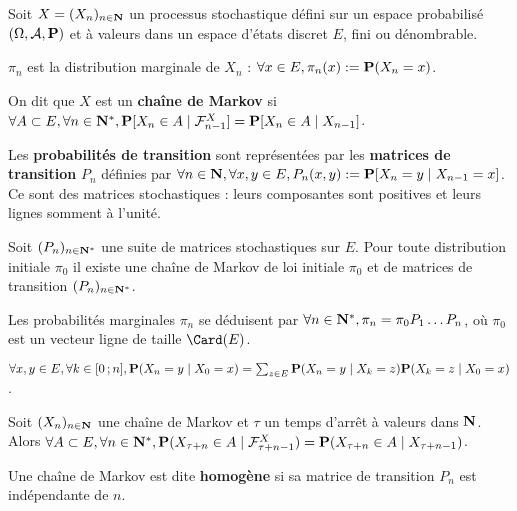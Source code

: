 Soit $X = (X_n)_{n \in \mathbf{N}}$ un processus stochastique défini sur un espace probabilisé $(\Omega,\mathcal{A},\mathbf{P})$ et à valeurs dans un espace d'états discret $E$, fini ou dénombrable.

\begin{note}
	$\pi_n$ est la distribution marginale de $X_n$ : $\forall x \in E, \pi_n(x) := \mathbf{P}(X_n = x)$.
\end{note}

\begin{defn}
	On dit que $X$ est un \textbf{chaîne de Markov} si $\forall A \subset E, \forall n \in \mathbf{N}^*, \mathbf{P}[X_n \in A \mid \mathcal{F}_{n - 1}^X] = \mathbf{P}[X_n \in A \mid X_{n - 1}]$.
\end{defn}

Les \textbf{probabilités de transition} sont représentées par les \textbf{matrices de transition} $P_n$ définies par $\forall n \in \mathbf{N}, \forall x,y \in E, P_n(x,y) := \mathbf{P} [X_n = y \mid X_{n - 1} = x]$.
Ce sont des matrices stochastiques : leurs composantes sont positives et leurs lignes somment à l'unité.

\begin{pop}
	Soit $(P_n)_{n \in \mathbf{N}^*}$ une suite de matrices stochastiques sur $E$.
	Pour toute distribution initiale $\pi_0$ il existe une chaîne de Markov de loi initiale $\pi_0$ et de matrices de transition $(P_n)_{n \in \mathbf{N}^*}$.
\end{pop}

Les probabilités marginales $\pi_n$ se déduisent par $\forall n \in \mathbf{N}^*, \pi_n = \pi_0 P_1 \ldots P_n$, où $\pi_0$ est un vecteur ligne de taille $\Card(E)$.

\begin{pop}
	$\forall x,y \in E, \forall k \in \mathopen{}\mathclose{\left[0\mathclose{}\mathpunct{};n\right]}, \mathbf{P}(X_n = y \mid X_0 = x) = \sum_{z \in E} \mathbf{P}(X_n = y \mid X_k = z) \mathbf{P}(X_k = z \mid X_0 = x)$.
\end{pop}

\begin{thm}
	Soit $(X_n)_{n \in \mathbf{N}}$ une chaîne de Markov et $\tau$ un temps d'arrêt à valeurs dans $\mathbf{N}$.
	Alors $\forall A \subset E, \forall n \in \mathbf{N}^*, \mathbf{P}(X_{\tau + n} \in A \mid \mathcal{F}_{\tau + n - 1}^X) = \mathbf{P}(X_{\tau + n} \in A \mid X_{\tau + n - 1})$.
\end{thm}

\begin{defn}
	Une chaîne de Markov est dite \textbf{homogène} si sa matrice de transition $P_n$ est indépendante de $n$.
\end{defn}
